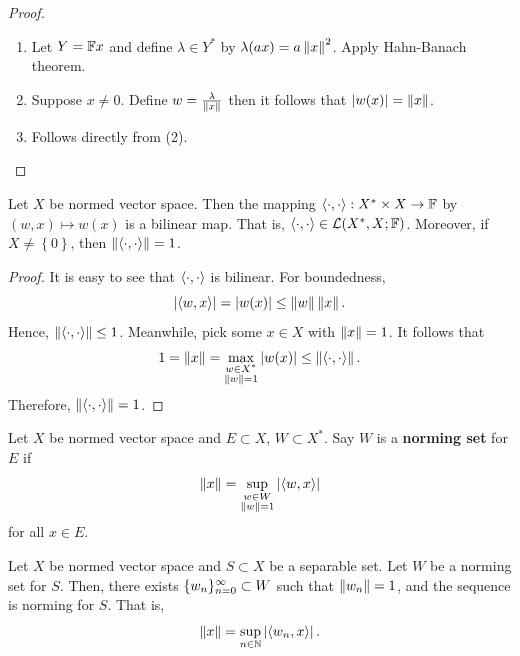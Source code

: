 \documentclass[a4paper]{article}
\begin{document}
\begin{proof}

\begin{enumerate}
\item Let $Y = \mathbb{F} x$ and define $\lambda \in Y^*$ by 
$\lambda(a x) = a \left\lVert x\right\rVert^2$. Apply Hahn-Banach theorem.

\item Suppose $x \neq 0$. Define $w = \frac{\lambda}{\left\lVert x\right\rVert}$
then it follows that $\left\lvert w(x)\right\rvert = \left\lVert x\right\rVert$.

\item Follows directly from (2).
\end{enumerate}

\end{proof}

\begin{prop}
Let $X$ be normed vector space. Then the mapping 
$\langle \cdot, \cdot \rangle : X^* \times X \to \mathbb{F}$ by 
$(w, x) \mapsto w(x)$ is a bilinear map. That is, 
$\langle \cdot , \cdot \rangle \in \mathcal{L}(X^*, X ; \mathbb{F})$. 
Moreover, 
if $X \neq \left\{ 0 \right\}$, 
then $\left\lVert \langle \cdot, \cdot \rangle\right\rVert
= 1$.
\end{prop}

\begin{proof}
It is easy to see that $\langle \cdot, \cdot \rangle$ is 
bilinear.  For boundedness, 
\[
\left\lvert \langle w, x \rangle\right\rvert = \left\lvert w(x)\right\rvert \leq \left\lVert w\right\rVert \left\lVert x\right\rVert.
\]
Hence, $\left\lVert \langle \cdot, \cdot \rangle\right\rVert \leq 1$. Meanwhile, 
pick some $x \in X$ with $\left\lVert x\right\rVert = 1$. It follows that 
\[
1 = \left\lVert x\right\rVert = \max_{\substack{w \in X^* \\ \left\lVert w\right\rVert = 1}}
\left\lvert w(x)\right\rvert \leq \left\lVert \langle \cdot, \cdot \rangle\right\rVert.
\]
Therefore, $\left\lVert \langle \cdot, \cdot \rangle\right\rVert = 1$.
\end{proof}

\begin{defi}
  Let $X$ be normed vector space and $E \subset X$, 
  $W \subset X^*$. Say $W$ is a \textbf{norming set}
  for $E$ if 
  \[
  \left\lVert x\right\rVert = \sup_{\substack{w \in W \\ \left\lVert w\right\rVert = 1}} 
  \left\lvert \langle w, x \rangle\right\rvert
  \]
  for all $x \in E$.
\end{defi}

\begin{prop}

Let $X$ be normed vector space and $S \subset X$ be a 
separable set. Let $W$ be a norming set for $S$. Then, 
there exists $\{ w_n \}_{n=0}^\infty \subset W$ such that $\left\lVert w_n\right\rVert 
= 1$, and the sequence is norming for $S$. That is, 
\[
\left\lVert x\right\rVert = \sup_{n \in \mathbb{N}} \left\lvert \langle w_n, x \rangle\right\rvert.
\]
\end{prop}
\end{document}
